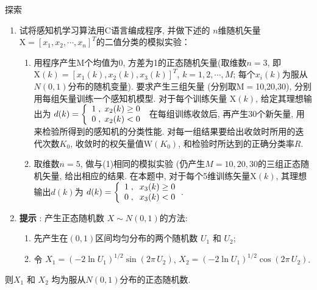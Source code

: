 
\begin{custom}[explorecolor]{探索}
\begin{enumerate}
\item 试将感知机学习算法用C语言编成程序, 并做下述的 $n$维随机矢量$\mbox{X}=[x_{1} ,x_{2} ,\cdots ,x_{n} ]^{T}$的二值分类的模拟实验：
	\begin{enumerate}
	\item 用程序产生M个均值为0, 方差为1的正态随机矢量(取维数$n=3$, 即 $\mbox{X}(k)=[x_{1} (k),x_{2} (k),x_{3} (k)]^{T}$, $k=1,2,\cdots, M$;
每个$x_{i} (k)$为服从$N(0,1)$分布的随机变量). 要求产生三组矢量 (分别取M$=$10,20,30), 分别用每组矢量训练一个感知机模型. 对于每个训练矢量 $\mbox{X}(k)$, 给定其理想输出为
$d(k)=
\left\{
\begin{array}{*{20}c}
 1\;,\;x_{2}(k)\ge 0 \\
 0\;,\;x_{2}(k)<0  \\
\end{array}
\right.$
在每组训练收敛后, 再产生30个新矢量, 用来检验所得到的感知机的分类性能. 对每一组结果要给出收敛时所用的迭代次数$K_{0}$, 收敛时的权矢量值$\mbox{W}(K_{0})$, 和检验时所达到的正确分类率$R$.
	\item 取维数$n=5$, 做与(1)相同的模拟实验 (仍产生$M=10,20,30$的三组正态随机矢量, 给出相应的结果. 在本题中, 对于每个5维训练矢量$\mbox{X}(k)$, 其理想输出$d(k)$为 $d(k)=
\left\{
\begin{array}{*{20}c}
 1\;,\;\;x_{3}(k)\ge 0\\
 0\;,\;\;x_{3}(k)<0\\
\end{array} \right.$.
	\end{enumerate}
\item[\textbullet] \textbf{提示 }: 产生正态随机数 $X\sim N(0,1)$的方法:
	\begin{enumerate}
	\item 先产生在$(0, 1)$区间均匀分布的两个随机数 $U_{1}$ 和 $U_{2}$;
	\item 令 $X_{1} =(-2\ln U_{1} )^{1/2}\sin (2\pi \,U_{2} )$, $X_{2} =(-2\ln U_{1} )^{1/2}\cos (2\pi \,U_{2})$.
	\end{enumerate}
\end{enumerate}
则$X_{1} $ 和 $X_{2} $ 均为服从$N(0,1)$分布的正态随机数.
\end{custom}
